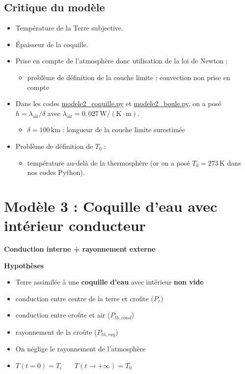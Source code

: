\documentclass[a4paper,12pt]{article}
\begin{document}
\subsection{Critique du modèle}

\begin{itemize}
    \item Température de la Terre subjective.
    \item Épaisseur de la coquille.
    \item Prise en compte de l’atmosphère donc utilisation de la loi de Newton :
    \begin{itemize}
        \item problème de définition de la couche limite : convection non prise en compte
    \end{itemize}
    \item Dans les codes {\href{https://github.com/pierrelouis-cmrt/CREPES/blob/main/modele2/codes%20python/modele2_coquille.py}{modele2\_coquille.py}} et {\href{https://github.com/pierrelouis-cmrt/CREPES/blob/main/modele2/codes%20python/modele2_boule.py}{modele2\_boule.py}}, on a posé $h = \lambda_{\text{air}} / \delta$ avec $\lambda_{\text{air}} = 0{,}027 \, \mathrm{W/(K \cdot m)}$.
    \begin{itemize}
        \item $\delta = 100\, \mathrm{km}$ : longueur de la couche limite surestimée
        
    \end{itemize}
    \item Problème de définition de $T_0$ :
    \begin{itemize}
        \item température au-delà de la thermosphère (or on a posé $T_0 = 273\, \mathrm{K}$ dans nos codes Python).
    \end{itemize}
\end{itemize}

\newpage
\section{Modèle 3 : Coquille d’eau avec intérieur conducteur }
\label{sec:modèle 3}
{\Large \textbf{Conduction interne + rayonnement externe}}

\vspace{0.5cm}
\textbf{Hypothèses}
\begin{itemize}
    \item Terre assimilée à une \textbf{coquille d'eau} avec intérieur \textbf{non vide}
    \item  conduction entre centre de la terre et croûte (\(P_r\))
    \item  conduction entre croûte et air (\(P_{th,cond}\))
    \item  rayonnement de la croûte (\(P_{th,ray}\))
    \item On néglige le rayonnement de l'atmosphère
    \item $T(t=0) = T_i$ \ \ \
$T(t \to +\infty) = T_0$
     
\end{itemize}
\end{document}
